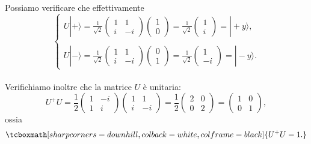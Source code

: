 \documentclass[a4paper,12pt,oneside]{book}
\begin{document}
Possiamo verificare che effettivamente
	\begin{equation}
		\begin{cases}
		U | + \rangle = \frac{1}{\sqrt{2}}
		\begin{pmatrix}
		1 & 1 \\
		i & -i
		\end{pmatrix}
		\begin{pmatrix}
		1\\
		0
		\end{pmatrix}=
		\frac{1}{\sqrt{2}}
		\begin{pmatrix}
		1\\
		i
		\end{pmatrix}=
		| +y \rangle , \\
		\\
		U | - \rangle= \frac{1}{\sqrt{2}}
		\begin{pmatrix}
		1 & 1 \\
		i & -i
		\end{pmatrix}
		\begin{pmatrix}
		0\\
		1
		\end{pmatrix}=
		\frac{1}{\sqrt{2}}
		\begin{pmatrix}
		1\\
		-i
		\end{pmatrix}=
		| -y \rangle . 
		\end{cases}
	\end{equation}\\
	
Verifichiamo inoltre che la matrice $U$ è unitaria:
	\begin{equation}
		U^+U = \frac{1}{2}
		\begin{pmatrix}
		1 & -i\\
		1 & i
		\end{pmatrix}
		\begin{pmatrix}
		1 & 1\\
		i & -i
		\end{pmatrix}=
		\frac{1}{2}
		\begin{pmatrix}
		2 & 0\\
		0 & 2
		\end{pmatrix}=
		\begin{pmatrix}
		1 & 0\\
		0 &1
		\end{pmatrix} , 
	\end{equation}
ossia
	\begin{equation}
		\tcboxmath[sharp corners=downhill, colback=white, colframe=black]{
			U^+U=1 .
			} 
	\end{equation}\\
\end{document}
